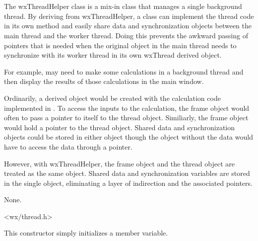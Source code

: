 \section{}\label{wxthreadhelper}

The wxThreadHelper class is a mix-in class that manages a single background
thread.  By deriving from wxThreadHelper, a class can implement the thread
code in its own  method
and easily share data and synchronization objects between the main thread
and the worker thread.  Doing this prevents the awkward passing of pointers
that is needed when the original object in the main thread needs to
synchronize with its worker thread in its own wxThread derived object.

For example,  may need to make some calculations
in a background thread and then display the results of those calculations in
the main window.

Ordinarily, a  derived object would be created
with the calculation code implemented in
.  To access the inputs to the
calculation, the frame object would often to pass a pointer to itself to the
thread object.  Similiarly, the frame object would hold a pointer to the
thread object.  Shared data and synchronization objects could be stored in
either object though the object without the data would have to access the
data through a pointer.

However, with wxThreadHelper, the frame object and the thread object are
treated as the same object.  Shared data and synchronization variables are
stored in the single object, eliminating a layer of indirection and the
associated pointers.


None.


<wx/thread.h>




\label{wxthreadhelperctor}


This constructor simply initializes a member variable.


